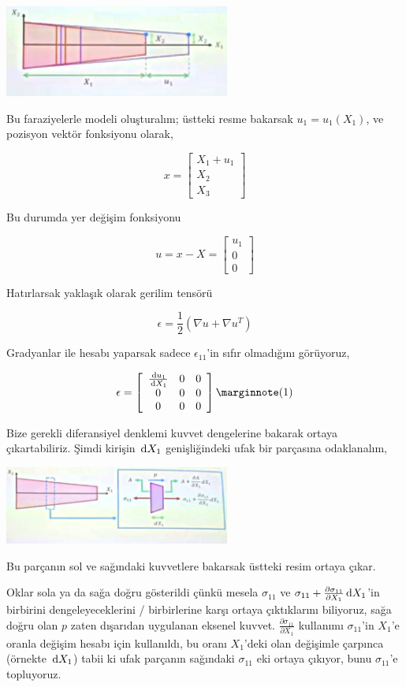 \documentclass[12pt,fleqn]{article}\usepackage{../../common}
\begin{document}
\includegraphics[width=20em]{phy_020_strs_04_08.jpg}

Bu faraziyelerle modeli oluşturalım; üstteki resme bakarsak $u_1 = u_1(X_1)$, ve
pozisyon vektör fonksiyonu olarak,

$$
x = \left[\begin{array}{c}
X_1 + u_1 \\ X_2 \\ X_3
\end{array}\right]
$$

Bu durumda yer değişim fonksiyonu

$$
u = x - X = \left[\begin{array}{c}
u_1 \\ 0 \\ 0
\end{array}\right]
$$

Hatırlarsak yaklaşık olarak gerilim tensörü

$$
\epsilon = \frac{1}{2} (\nabla u + \nabla u^T )
$$

Gradyanlar ile hesabı yaparsak sadece $\epsilon_{11}$'in sıfır olmadığını
görüyoruz,

$$
\epsilon = \left[\begin{array}{ccc}
\frac{\ud u_1}{\ud X_1} & 0 & 0 \\
0 & 0 & 0 \\
0 & 0 & 0 
\end{array}\right]
\mlabel{1}
$$

Bize gerekli diferansiyel denklemi kuvvet dengelerine bakarak ortaya
çıkartabiliriz. Şimdi kirişin $\,\mathrm{d} X_1$ genişliğindeki ufak bir parçasına
odaklanalım,

\includegraphics[width=20em]{phy_020_strs_04_07.jpg}

Bu parçanın sol ve sağındaki kuvvetlere bakarsak üstteki resim ortaya çıkar.

Oklar sola ya da sağa doğru gösterildi çünkü mesela $\sigma_{11}$ ve
$\sigma_{11} + \frac{\partial \sigma_{11}}{\partial X_1} \,\mathrm{d} X_1$'in
birbirini dengeleyeceklerini / birbirlerine karşı ortaya çıktıklarını
biliyoruz, sağa doğru olan $p$ zaten dışarıdan uygulanan eksenel kuvvet.
$\frac{\partial \sigma_{11}}{\partial X_1}$ kullanımı $\sigma_{11}$'in
$X_1$'e oranla değişim hesabı için kullanıldı, bu oranı $X_1$'deki
olan değişimle çarpınca (örnekte $\,\mathrm{d} X_1$) tabii ki ufak parçanın sağındaki
$\sigma_{11}$ eki ortaya çıkıyor, bunu $\sigma_{11}$'e topluyoruz.
\end{document}
